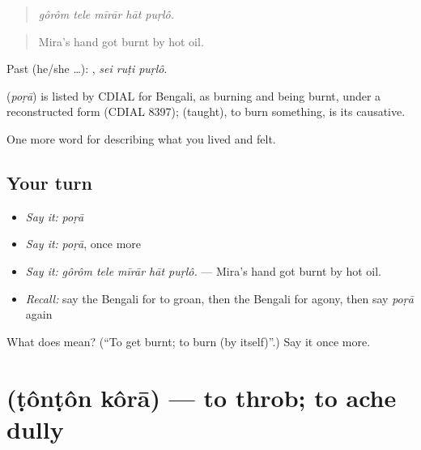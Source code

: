 \begin{quote}
    
\end{quote}

\begin{quote}
\emph{gôrôm tele mīrār hāt puṛlô.}
\end{quote}

\begin{quote}
Mira's hand got burnt by hot oil.
\end{quote}

Past (he/she …):   , \emph{sei ruṭi puṛlô}.

\begin{cousinweb}
\textbf{} (\emph{poṛā}) is listed by CDIAL for Bengali, as burning and being burnt, under a reconstructed form (CDIAL 8397);  (taught), to burn something, is its causative.
\end{cousinweb}

\begin{grammarlens}[title={What you've built}]
One more word for describing what you lived and felt.
\end{grammarlens}

\subsection*{Your turn}
\begin{itemize}
\raggedright
  \item \emph{Say it:} \emph{poṛā}
  \item \emph{Say it:} \emph{poṛā}, once more
  \item \emph{Say it:} \emph{gôrôm tele mīrār hāt puṛlô.} — Mira's hand got burnt by hot oil.
  \item \emph{Recall:} say the Bengali for to groan, then the Bengali for agony, then say \emph{poṛā} again
\end{itemize}

\begin{tcolorbox}[breakable,colback=teal!4,colframe=teal!35!black,title={Before you move on}]
What does  mean? (\textquotedblleft{}To get burnt; to burn (by itself)\textquotedblright{}.) Say it once more.
\end{tcolorbox}
\section[\texorpdfstring{\bn{টনটন} \bn{করা} (ṭônṭôn kôrā)}{টনটন করা (ṭônṭôn kôrā)}]{  (ṭônṭôn kôrā) — to throb; to ache dully}

